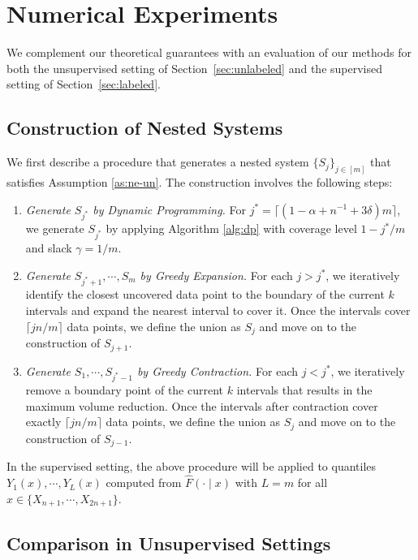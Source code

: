 \section{Numerical Experiments}\label{sec:numerical_experiments}

We complement our theoretical guarantees with an evaluation of our methods for both the unsupervised setting of Section~\ref{sec:unlabeled} and the supervised setting of Section~\ref{sec:labeled}. 

\subsection{Construction of Nested Systems}\label{sec:con-nest-m}

We first describe a procedure that generates a nested system $\{S_j\}_{j\in[m]}$ that satisfies Assumption \ref{as:ne-un}. The construction involves the following steps:
\begin{enumerate}
\item \textit{Generate $S_{j^*}$ by Dynamic Programming.} For $j^* = \lceil(1-\alpha + n^{-1} + 3\delta) m \rceil$, we generate $S_{j^*}$ by applying Algorithm \ref{alg:dp} with coverage level $1-j^*/m$ and slack $\gamma=1/m$.
\item \textit{Generate $S_{j^*+1},\cdots,S_m$ by Greedy Expansion.} For each $j>j^*$, we iteratively identify the closest uncovered data point to the boundary of the current $k$ intervals and expand the nearest interval to cover it. Once the intervals cover $\lceil jn/m \rceil$ data points, we define the union as $S_j$ and move on to the construction of $S_{j+1}$.
\item \textit{Generate $S_1,\cdots, S_{j^*-1}$ by Greedy Contraction.} For each $j<j^*$, we iteratively remove a boundary point of the current $k$ intervals that results in the maximum volume reduction. Once the intervals after contraction cover exactly $\lceil jn/m \rceil$ data points, we define the union as $S_j$ and move on to the construction of $S_{j-1}$.
\end{enumerate}

In the supervised setting, the above procedure will be applied to quantiles $Y_1(x),\cdots,Y_L(x)$ computed from $\widehat{F}(\cdot\mid x)$ with $L=m$ for all $x\in\{X_{n+1},\cdots,X_{2n+1}\}$.


\subsection{Comparison in Unsupervised Settings}

